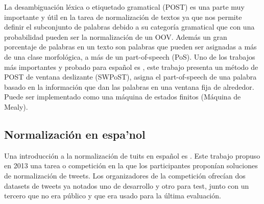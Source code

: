 \documentclass[spanish,12pt, a4paper,twoside]{paper}
\begin{document}
La desambiguación léxica o etiquetado gramatical (POST) es una parte muy importante y útil en la tarea de normalización de textos ya que nos permite definir el subconjunto de palabras debido a su categoría gramatical que con una probabilidad pueden ser la normalización de un OOV. Además un gran porcentaje de palabras en un texto son palabras que pueden ser asignadas a más de una clase morfológica, a más de un part-of-speech (PoS). Uno de los trabajos más importantes y probado para español es \cite{sanchezforcada:2004}, este trabajo presenta un método de POST de ventana deslizante (SWPoST), asigna el part-of-speech de una palabra basado en la información que dan las palabras en una ventana fija de alrededor. Puede ser implementado como una máquina de estados finitos (Máquina de Mealy).


\subsection{Normalización en espa'nol}\label{sec:normalzacionenespanol}
Una introducción a la normalización de tuits en español es \cite{alegria:2013}\cite{alegria:2015}. Este trabajo propuso en 2013 una tarea o competición en la que los participantes proponían soluciones de normalización de tweets. Los organizadores de la competición ofrecían dos datasets de tweets ya notados uno de desarrollo y otro para test, junto con un tercero que no era público y que era usado para la última evaluación.\\
\end{document}

